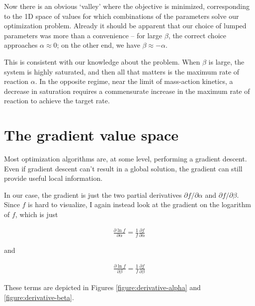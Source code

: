 \documentclass{article}
\begin{document}
Now there is an obvious `valley' where the objective is minimized, corresponding to the 1D space of values for which combinations of the parameters solve our optimization problem.  Already it should be apparent that our choice of lumped parameters was more than a convenience -- for large \(\beta\), the correct choice approaches \(\alpha \approx 0\); on the other end, we have \(\beta \approx -\alpha\).

This is consistent with our knowledge about the problem.  When \(\beta\) is large, the system is highly saturated, and then all that matters is the maximum rate of reaction \(\alpha\).  In the opposite regime, near the limit of mass-action kinetics, a decrease in saturation requires a commensurate increase in the maximum rate of reaction to achieve the target rate.

\section{The gradient value space}

Most optimization algorithms are, at some level, performing a gradient descent.  Even if gradient descent can't result in a global solution, the gradient can still provide useful local information.

In our case, the gradient is just the two partial derivatives \(\partial f/\partial \alpha\) and \(\partial f / \partial \beta\).  Since \(f\) is hard to visualize, I again instead look at the gradient on the logarithm of \(f\), which is just

\begin{align}
\frac{\partial \ln f}{\partial \alpha} = \frac{1}{f} \frac{\partial f}{\partial \alpha}
\end{align}

and

\begin{align}
\frac{\partial \ln f}{\partial \beta} = \frac{1}{f} \frac{\partial f}{\partial \beta}
\end{align}

These terms are depicted in Figures \ref{figure:derivative-alpha} and \ref{figure:derivative-beta}.
\end{document}
